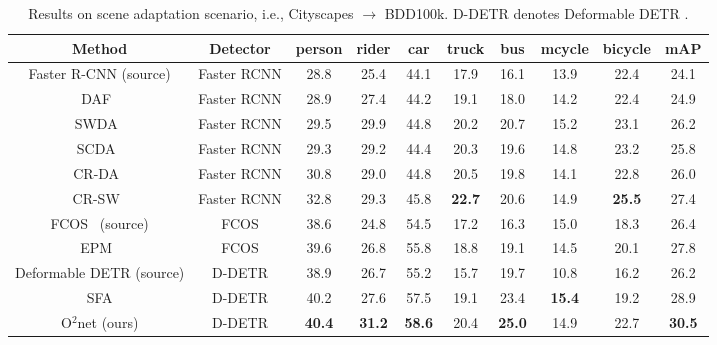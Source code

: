 \documentclass[sigconf]{acmart}
\begin{document}
    

\begin{table*}[t]
\centering
            \small
            \caption{Results on scene adaptation scenario, i.e., Cityscapes $\rightarrow$ BDD100k. D-DETR denotes Deformable DETR \cite{zhu2020deformable}.}
            \label{tab:bdd}
            \setlength{\tabcolsep}{3.2mm}
            \begin{tabular}{c|c|ccccccc|c}
                \toprule[1.0pt]
                Method & Detector & person & rider & car & truck & bus & mcycle & bicycle & mAP \\
            
                \hline
                Faster R-CNN (source) & Faster RCNN & 28.8 & 25.4 & 44.1 & 17.9 & 16.1 & 13.9 & 22.4 & 24.1 \\
                DAF~\cite{dafaster} & Faster RCNN & 28.9 & 27.4 & 44.2 & 19.1 & 18.0 & 14.2 & 22.4 & 24.9 \\
                SWDA~\cite{strong-weak} & Faster RCNN & 29.5 & 29.9 & 44.8 & 20.2 & 20.7 & 15.2 & 23.1 & 26.2 \\
                SCDA~\cite{scda} & Faster RCNN & 29.3 & 29.2 & 44.4 & 20.3 & 19.6 & 14.8 & 23.2 & 25.8 \\
                CR-DA~\cite{xu2020exploring} & Faster RCNN & 30.8 & 29.0 & 44.8 & 20.5 & 19.8 & 14.1 & 22.8 & 26.0 \\
                CR-SW~\cite{xu2020exploring} & Faster RCNN & 32.8 & 29.3 & 45.8 & \textbf{22.7} & 20.6 & 14.9 & \textbf{25.5} & 27.4 \\
                \hline
                FCOS~\cite{tian2019fcos} (source) & FCOS & 38.6 & 24.8 & 54.5 & 17.2 & 16.3 & 15.0 & 18.3 & 26.4 \\
                EPM~\cite{hsu2020every} & FCOS & 39.6 & 26.8 & 55.8 & 18.8 & 19.1 & 14.5 & 20.1 & 27.8 \\
                \hline
                Deformable DETR (source) & D-DETR & 38.9 & 26.7 & 55.2 & 15.7 & 19.7 & 10.8 & 16.2 & 26.2 \\
                SFA \cite{wang2021exploring} & D-DETR &  40.2 & 27.6 & 57.5 & 19.1 & 23.4 & \textbf{15.4} & 19.2 & 28.9 \\
                O$^2$net (ours) & D-DETR & \textbf{40.4} & \textbf{31.2} & \textbf{58.6} & 20.4 & \textbf{25.0} & 14.9 & 22.7 & \textbf{30.5} \\
                \bottomrule[1.0pt]
            \end{tabular}
\vspace{-2mm}
    \end{table*}
\end{document}
